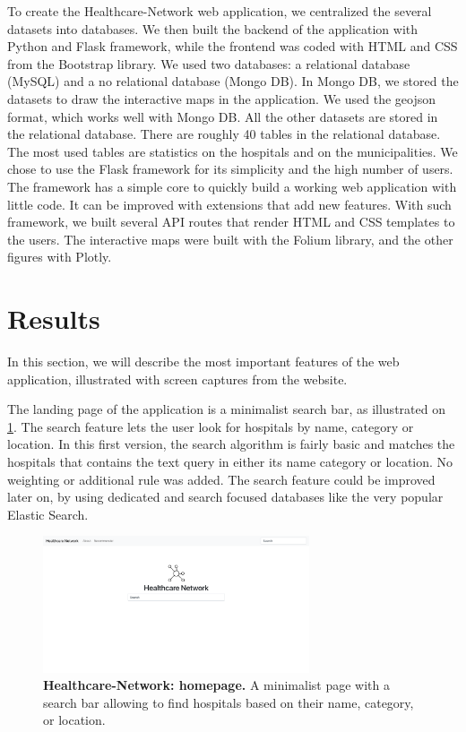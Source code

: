 To create the Healthcare-Network web application, we centralized the several
datasets into databases. We then built the backend of the application with
Python and Flask framework, while the frontend was coded with HTML and CSS from
the Bootstrap library. We used two databases: a relational database (MySQL) and
a no relational database (Mongo DB). In Mongo DB, we stored the datasets to draw
the interactive maps in the application. We used the geojson format, which works
well with Mongo DB. All the other datasets are stored in the relational
database. There are roughly 40 tables in the relational database. The most used
tables are statistics on the hospitals and on the municipalities. We chose to
use the Flask framework for its simplicity and the high number of users. The
framework has a simple core to quickly build a working web application with
little code. It can be improved with extensions that add new features. With such
framework, we built several API routes that render HTML and CSS templates to the
users. The interactive maps were built with the Folium library, and the other
figures with Plotly.

\section{Results}

In this section, we will describe the most important features of the web
application, illustrated with screen captures from the website.

The landing page of the application is a minimalist search bar, as illustrated
on \cref{fig:hn-home}. The search feature lets the user look for hospitals by
name, category or location. In this first version, the search algorithm is
fairly basic and matches the hospitals that contains the text query in either
its name category or location. No weighting or additional rule was added. The
search feature could be improved later on, by using dedicated and search focused
databases like the very popular Elastic Search.

\begin{figure}[h]
    \includegraphics[width=0.7\textwidth]{images/healthcare-network/home.png}
    \centering
    \caption{ \textbf{Healthcare-Network: homepage.} A minimalist page with a
        search bar allowing to find hospitals based on their name, category, or
        location. }
    \label{fig:hn-home}
\end{figure}

